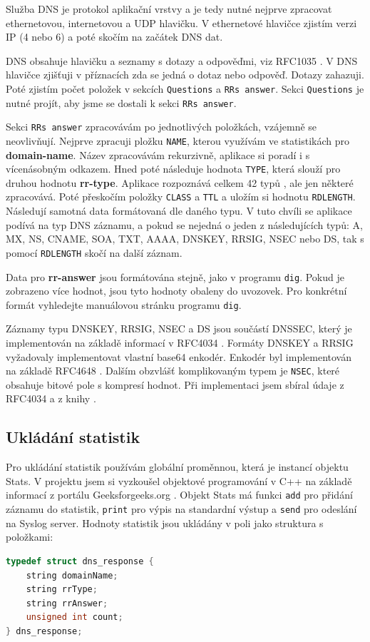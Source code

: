 \documentclass[11pt,a4paper]{article}
\begin{document}
Služba DNS je protokol aplikační vrstvy \cite{dns-prez} a je tedy nutné nejprve zpracovat ethernetovou, internetovou a UDP hlavičku. V ethernetové hlavičce zjistím verzi IP (4 nebo 6) a poté skočím na začátek DNS dat.

DNS obsahuje hlavičku a seznamy s dotazy a odpověďmi, viz RFC1035 \cite{rfc1035}. V DNS hlavičce zjišťuji v příznacích zda se jedná o dotaz nebo odpověď. Dotazy zahazuji. Poté zjistím počet položek v sekcích \texttt{Questions} a \texttt{RRs answer}. Sekci \texttt{Questions} je nutné projít, aby jsme se dostali k sekci \texttt{RRs answer}.

Sekci \texttt{RRs answer} zpracovávám po jednotlivých položkách, vzájemně se neovlivňují. Nejprve zpracuji pložku \texttt{NAME}, kterou využívám ve statistikách pro \textbf{domain-name}. Název zpracovávám rekurzivně, aplikace si poradí i s vícenásobným odkazem. Hned poté následuje hodnota \texttt{TYPE}, která slouží pro druhou hodnotu \textbf{rr-type}. Aplikace rozpoznává celkem 42 typů \cite{dns-types}, ale jen některé zpracovává. Poté přeskočím položky \texttt{CLASS} a \texttt{TTL} a uložím si hodnotu \texttt{RDLENGTH}. Následují samotná data formátovaná dle daného typu. V tuto chvíli se aplikace podívá na typ DNS záznamu, a pokud se nejedná o jeden z následujících typů: A, MX, NS, CNAME, SOA, TXT, AAAA, DNSKEY, RRSIG, NSEC nebo DS, tak s pomocí \texttt{RDLENGTH} skočí na další záznam.

Data pro \textbf{rr-answer} jsou formátována stejně, jako v programu \texttt{dig}. Pokud je zobrazeno více hodnot, jsou tyto hodnoty obaleny do uvozovek. Pro konkrétní formát vyhledejte manuálovou stránku programu \texttt{dig}.

Záznamy typu DNSKEY, RRSIG, NSEC a DS jsou součástí DNSSEC, který je implementován na základě informací v RFC4034 \cite{rfc4034}. Formáty DNSKEY a RRSIG vyžadovaly implementovat vlastní base64 enkodér. Enkodér byl implementován na základě RFC4648 \cite{rfc4648}. Dalším obzvlášť komplikovaným typem je \texttt{NSEC}, které obsahuje bitové pole s kompresí hodnot. Při implementaci jsem sbíral údaje z RFC4034 a z knihy  \cite{fall2011tcp}.

\subsection{Ukládání statistik}
Pro ukládání statistik používám globální proměnnou, která je instancí objektu Stats. V projektu jsem si vyzkoušel objektové programování v C++ na základě informací z portálu Geeksforgeeks.org \cite{cpp-objects}. Objekt Stats má funkci \texttt{add} pro přidání záznamu do statistik, \texttt{print} pro výpis na standardní výstup a \texttt{send} pro odeslání na Syslog server. Hodnoty statistik jsou ukládány v poli jako struktura s položkami:
\begin{lstlisting}[language=C++]
typedef struct dns_response {
	string domainName;
	string rrType;
	string rrAnswer;
	unsigned int count;
} dns_response;
\end{lstlisting}
\end{document}
